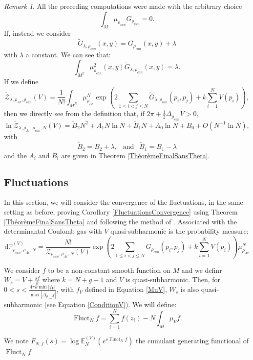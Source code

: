 \documentclass{article}
\theoremstyle{definition}
\theoremstyle{remark}
\newtheorem{Remark}[theorem]{Remark}
\DeclareMathOperator{\Fluct}{Fluct}
\begin{document}
\begin{Remark}
    All the preceding computations were made with the arbitrary choice $$\int_{M}\mu_{\rho_{can}}G_{\rho_{can}}=0.$$ If, instead we consider $$\tilde{G}_{\lambda,\rho_{can}}(x,y)=G_{\rho_{can}}(x,y)+\lambda$$ with $\lambda$ a constant. We can see that: $$\int_{M^{2}}\mu_{\rho_{can}}^{2}(x,y)\tilde{G}_{\lambda,\rho_{can}}(x,y)=\lambda.$$ If we define $$\tilde{\mathcal{Z}}_{\lambda,\rho_{Ar},\rho_{can}}(V)=\frac{1}{N!}\int_{M^{N}}\mu_{\rho_{Ar}}^{N}\exp\left(2\sum_{1\leq i < j \leq N} \tilde{G}_{\lambda,\rho_{can}}(p_{i},p_{j}) +k\sum_{i=1}^{N} V(p_{i})\right),$$ then we directly see from the definition that, if $2\pi+\frac{1}{2}\Delta_{\rho_{can}}V>0,$ $$        \ln \tilde{\mathcal{Z}}_{\lambda,\rho_{Ar},\rho_{can},N}(V)=\tilde{B}_{2}N^{2}+A_{1}N\ln N+\tilde{B}_{1} N+A_{0}\ln N+B_{0}+O(N^{-1}\ln N),
$$ with $$\tilde{B}_{2}=B_{2}+\lambda, ~~ \text{ and } ~~ \tilde{B}_{1}=B_{1}-\lambda$$
and the $A_{i}$ and $B_{i}$ are given in Theorem \ref{ThéorèmeFinalSansTheta}.
\end{Remark}
\subsection{Fluctuations}
In this section, we will consider the convergence of the fluctuations, in the same setting as before, proving Corollary \ref{FluctuationsConvergence} using Theorem \ref{ThéorèmeFinalSansTheta} and following the method of \cite{ameur2025freeenergyfluctuationsrandom,ameur2025twodimensionalcoulombgasfluctuations}. 
Associated with the determinantal Coulomb gas with $V$ quasi-subharmonic is the probability measure:
\begin{equation}\label{eq:Proba} \mathrm{d}\mathbb{P}_{\rho_{can},\rho_{Ar},N}^{(V)}=\frac{N!}{\mathcal{Z}_{\rho_{can},\rho_{Ar},N}(V)}\exp\left(2\sum_{1\leq i < j \leq N} G_{\rho_{can}}(p_{i},p_{j}) +k\sum_{i=1}^{N} V(p_{i})\right)\mu_{\rho_{Ar}}^{N}
\end{equation}

We consider $f$ to be a non-constant smooth function on $M$ and we definr $W_{s}=V+\frac{sf}{k}$ where $k=N+g-1$ and $V$ is quasi-subharmonic. Then, for $0< s <\frac{4\pi k \min|f_{V}|}{\max|\Delta_{\rho_{can}} f| }$, with $f_{V}$ defined in Equation \eqref{MuV}, $W_{s}$ is also quasi-subharmonic (see Equation \eqref{ConditionV}). We will define: $$\Fluct_{N}f=\sum_{i=1}^{N} f(z_{i})-N\int_{M} \mu_{V} f. $$ 

We note $F_{N,f}(s)=\log \mathbb{E}_{N}^{(V)} \left(e^{s \Fluct_{N}f} \right) $ the cumulant generating functional of $\Fluct_{N}f$
\end{document}
